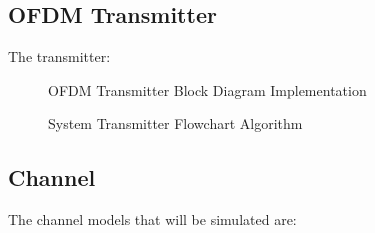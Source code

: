 \subsection{\gls{OFDM} Transmitter}
The transmitter:
\begin{figure}[htpb!]
	\centerline{\resizebox{15cm}{!}{}}
	\caption{\gls{OFDM} Transmitter Block Diagram Implementation}
	\label{fig:ofdm_t_meth}
\end{figure}
\begin{figure}[htpb!]
	\centerline{}
	\caption{System Transmitter Flowchart Algorithm}
	\label{fig:system_transmitter}
\end{figure}

\pagebreak


\subsection{Channel}
The channel models that will be simulated are:
